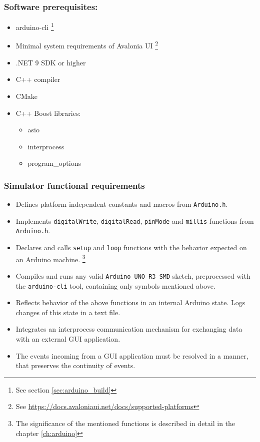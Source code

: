 \subsubsection{Software prerequisites:} \label{prerequisits}
\begin{itemize}
    \item arduino-cli \footnote{See section \ref{sec:arduino_build}}
    \item Minimal system requirements of Avalonia UI \footnote{See \url{https://docs.avaloniaui.net/docs/supported-platforms}}
    \item .NET 9 SDK or higher
    \item C++ compiler
    \item CMake
    \item C++ Boost libraries:
    \begin{itemize}
        \item asio
        \item interprocess
        \item program\_options
    \end{itemize}
\end{itemize}

\subsubsection{Simulator functional requirements}
\begin{itemize}
    \item Defines platform independent constants and macros from \texttt{Arduino.h}.
    \item Implements \texttt{digitalWrite}, \texttt{digitalRead}, \texttt{pinMode} and \texttt{millis} functions from \texttt{Arduino.h}.
    \item Declares and calls \texttt{setup} and \texttt{loop} functions with the behavior expected on an Arduino machine. 
    \footnote{The significance of the mentioned functions is described in detail in the chapter \ref{ch:arduino}}
    \item Compiles and runs any valid \texttt{Arduino UNO R3 SMD} sketch, preprocessed with the \texttt{arduino-cli} tool, containing only symbols mentioned above.
    \item Reflects behavior of the above functions in an internal Arduino state. Logs changes of this state in a text file.
    \item Integrates an interprocess communication mechanism for exchanging data with an external GUI application.
    \item The events incoming from a GUI application must be resolved in a manner, that preserves the continuity of events.
\end{itemize}

